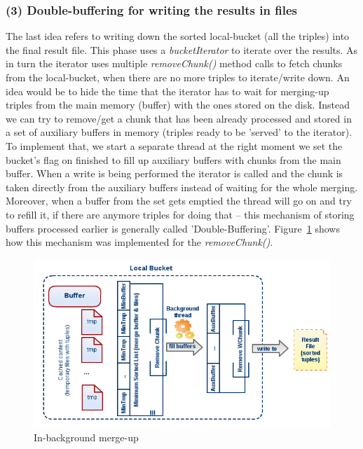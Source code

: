 % 
\subsubsection*{(3) Double-buffering for writing the results in files}

The last idea refers to writing down the sorted local-bucket (all the triples) into the final result file. This phase uses a \textit{bucketIterator} to iterate over the results. As in turn the iterator uses multiple \textit{removeChunk()} method calls to fetch chunks from the local-bucket, when there are no more triples to iterate/write down. An idea would be to hide the time that the iterator has to wait for merging-up triples from the main memory (buffer) with the ones stored on the disk. Instead we can try to remove/get a chunk that has been already processed and stored in a set of auxiliary buffers in memory (triples ready to be 'served' to the iterator). To implement that, we start a separate thread at the right moment we set the bucket's flag on finished to fill up auxiliary buffers with chunks from the main buffer. When a write is being performed the iterator is called and the chunk is taken directly from the auxiliary buffers instead of waiting for the whole merging. Moreover, when a buffer from the set gets emptied the thread will go on and try to refill it, if there are anymore triples for doing that -- this mechanism of storing buffers processed earlier is generally called 'Double-Buffering'. Figure~\ref{fig:diag5} shows how this mechanism was implemented for the \textit{removeChunk()}. 

\begin{figure}
\centering
\includegraphics[scale=0.6]{diag5}
\caption{In-background merge-up}
\label{fig:diag5}
\end{figure}

